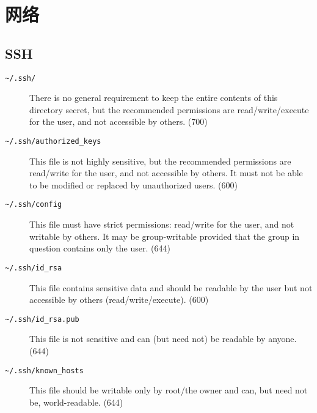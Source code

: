 \documentclass[12pt]{ctexart}
\theoremstyle{definition}
\begin{document}
    \section{网络}

    \subsection{SSH}

    \begin{description}
        \item[\texttt{\~{}/.ssh/}] There is no general requirement to keep the entire contents of this directory secret, but the recommended permissions are read/write/execute for the user, and not accessible by others. (700)
        \item[\texttt{\~{}/.ssh/authorized\_keys}] This file is not highly sensitive, but the recommended permissions are read/write for the user, and not accessible by others. It must not be able to be modified or replaced by unauthorized users. (600)
        \item[\texttt{\~{}/.ssh/config}] This file must have strict permissions: read/write for the user, and not writable by others. It may be group-writable provided that the group in question contains only the user. (644)
        \item[\texttt{\~{}/.ssh/id\_rsa}] This file contains sensitive data and should be readable by the user but not accessible by others (read/write/execute). (600)
        \item[\texttt{\~{}/.ssh/id\_rsa.pub}] This file is not sensitive and can (but need not) be readable by anyone. (644)
        \item[\texttt{\~{}/.ssh/known\_hosts}] This file should be writable only by root/the owner and can, but need not be, world-readable. (644)
    \end{description}
\end{document}
